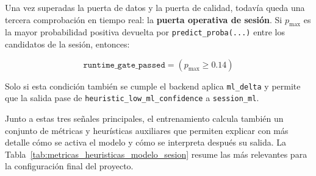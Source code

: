 Una vez superadas la puerta de datos y la puerta de calidad, todavía queda una
tercera comprobación en tiempo real: la \textbf{puerta operativa de sesión}. Si
\(p_{\max}\) es la mayor probabilidad positiva devuelta por
\texttt{predict\_proba(...)} entre los candidatos de la sesión, entonces:

\[
\texttt{runtime\_gate\_passed} = (p_{\max} \geq 0.14)
\]

Solo si esta condición también se cumple el backend aplica \texttt{ml\_delta} y
permite que la salida pase de \texttt{heuristic\_low\_ml\_confidence} a
\texttt{session\_ml}.

Junto a estas tres señales principales, el entrenamiento calcula también un
conjunto de métricas y heurísticas auxiliares que permiten explicar con más
detalle cómo se activa el modelo y cómo se interpreta después su salida. La
Tabla~\ref{tab:metricas_heuristicas_modelo_sesion} resume las más relevantes
para la configuración final del proyecto.

